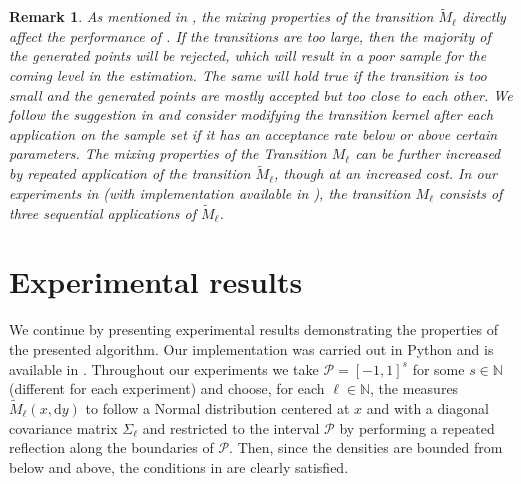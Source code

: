 \documentclass{article}
\newtheorem{remark}[theorem]{Remark}
\newcommand{\cP}{\mathcal{P}}
\newcommand{\IN}{\mathbb{N}}
\renewcommand{\d}{{\text{d}}}
\theoremstyle{definition}
\begin{document}
\begin{remark}
As mentioned in \cite[Sec.~4.3]{cerouSequentialMonteCarlo2012}, the mixing properties of the transition
$\widetilde{M}_\ell$ directly affect the performance of . If the transitions are too large, then
the majority of the generated points will be rejected, which will result in a poor sample for the coming level in the estimation.
The same will hold true if the transition is too small and the generated points are mostly accepted but too
close to each other. We follow the suggestion in \cite[Sec.~4.3]{cerouSequentialMonteCarlo2012} and consider
modifying the transition kernel after each application on the sample set if it has an acceptance rate below or above
certain parameters. The mixing properties of the Transition $M_\ell$ can be further increased by repeated application
of the transition $\widetilde{M}_\ell$, though at an increased cost. In our experiments in 
(with implementation available in \cite{githubCodeC}), the transition $M_\ell$ consists of three sequential applications of
$\widetilde{M}_\ell$.
\end{remark}

\section{Experimental results}
\label{sec:experiments}
We continue by presenting experimental results de\-mon\-stra\-ting the properties of the presented algorithm.
Our implementation was carried out in Python and is available in \cite{githubCodeC}. Throughout our experiments we
take $\cP=[-1,1]^s$ for some $s\in\IN$ (different for each experiment) and choose, for each $\ell\in\IN$,
the measures $\widetilde{M}_\ell(x,\d y)$ to follow a Normal distribution centered at
$x$ and with a diagonal covariance matrix $\Sigma_\ell$ and restricted to the interval $\cP$ by
performing a repeated reflection along the boundaries of $\cP$. Then, since the densities are bounded from below
and above, the conditions in  are clearly satisfied.
\end{document}
